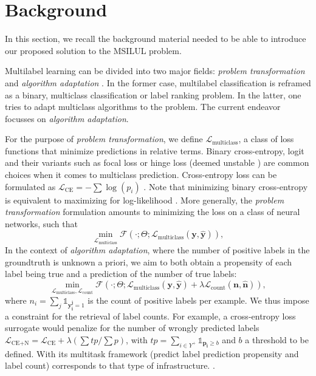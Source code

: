 
\section{Background}
\label{sec:org8c910ea}

In this section, we recall the background material needed to be able to introduce our proposed solution to the MSILUL problem.

Multilabel learning can be divided into two major fields: \emph{problem transformation} and \emph{algorithm adaptation} \cite{multilabelReview}. In the former case, multilabel classification is reframed as a binary, multiclass classification or label ranking problem. In the latter, one tries to adapt multiclass algorithms to the problem. The current endeavor focusses on \emph{algorithm adaptation}.


For the purpose of \emph{problem transformation}, we define \(\mathcal{L}_{\text {multiclass}}\), a class of loss functions that minimize predictions in relative terms. Binary cross-entropy, logit and their variants such as focal loss or hinge loss (deemed unstable \cite{focalLoss}) are common choices when it comes to multiclass prediction. Cross-entropy loss can be formulated as \(\mathcal{L}_{\text {CE}}=-\sum \log \left(p_{i}\right)\) . Note that minimizing binary cross-entropy is equivalent to maximizing for log-likelihood \cite[Section 4.3.4]{Bishop}. More generally, the \emph{problem transformation} formulation amounts to minimizing the loss on a class of neural networks, such that
%
\begin{equation}
\underset{\mathcal{L}_{\text {multiclass}}} {\min} \mathcal{F}\left(\cdot ; \Theta; \mathcal{L}_{\text {multiclass}} (\mathbf{y}, \hat{\mathbf{y}}) \right),
\end{equation}
%
In the context of \emph{algorithm adaptation}, where the number of positive labels in the groundtruth is unknown a priori, we aim to both obtain a propensity of each label being true and a prediction of the number of true labels: 
%
\begin{equation}
\underset{\mathcal{L}_{\text {multiclass}}, \mathcal{L}_{\text {count}}} {\min} \mathcal{F}\left(\cdot ; \Theta; \mathcal{L}_{\text {multiclass}} (\mathbf{y}, \hat{\mathbf{y}}) + \lambda \mathcal{L}_{\text {count}} (\mathbf{n}, \hat{\mathbf{n}})\right),
\end{equation}
%
where \(n_i = \sum_j \mathds{1}_{\mathbf{y_i^j} = 1}\) is the count of positive labels per example. We thus impose a constraint for the retrieval of label counts. For example, a cross-entropy loss surrogate would penalize for the number of wrongly predicted labels \(\mathcal{L}_{\text {CE+N}}= \mathcal{L}_{\text {CE}} + \lambda (\sum tp / \sum p)\), with \(t p=\sum_{i \in Y^{+}} \mathds{1}_{\mathbf{p_i} \geq b}\) and \(b\) a threshold to be defined. With its multitask framework (predict label prediction propensity and label count) \cite{multitaskLabel} corresponds to that type of infrastructure. .

